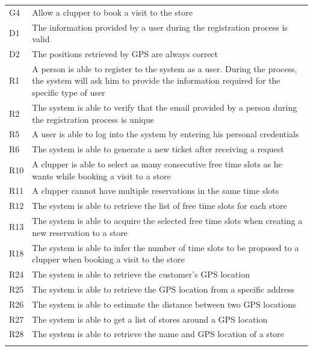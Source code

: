 \documentclass[
]{article}
\begin{document}
\begin{longtable}[]{@{}
  >{\raggedright\arraybackslash}p{}
  >{\raggedright\arraybackslash}p{}@{}}
\toprule
G4 & Allow a clupper to book a visit to the store \\ \addlinespace
\midrule
\endhead
D1 & The information provided by a user during the registration process
is valid \\ \addlinespace
D2 & The positions retrieved by GPS are always correct \\ \addlinespace
R1 & A person is able to register to the system as a user. During the
process, the system will ask him to provide the information required for
the specific type of user \\ \addlinespace
R2 & The system is able to verify that the email provided by a person
during the registration process is unique \\ \addlinespace
R5 & A user is able to log into the system by entering his personal
credentials \\ \addlinespace
R6 & The system is able to generate a new ticket after receiving a
request \\ \addlinespace
R10 & A clupper is able to select as many consecutive free time slots as
he wants while booking a visit to a store \\ \addlinespace
R11 & A clupper cannot have multiple reservations in the same time
slots \\ \addlinespace
R12 & The system is able to retrieve the list of free time slots for
each store \\ \addlinespace
R13 & The system is able to acquire the selected free time slots when
creating a new reservation to a store \\ \addlinespace
R18 & The system is able to infer the number of time slots to be
proposed to a clupper when booking a visit to the store \\ \addlinespace
R24 & The system is able to retrieve the customer's GPS
location \\ \addlinespace
R25 & The system is able to retrieve the GPS location from a specific
address \\ \addlinespace
R26 & The system is able to estimate the distance between two GPS
locations \\ \addlinespace
R27 & The system is able to get a list of stores around a GPS
location \\ \addlinespace
R28 & The system is able to retrieve the name and GPS location of a
store \\ \addlinespace
\bottomrule
\end{longtable}
\end{document}
